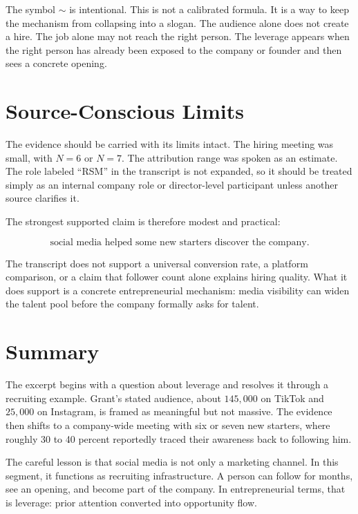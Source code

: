 The symbol \(\sim\) is intentional. This is not a calibrated formula. It is a way to keep the mechanism from collapsing into a slogan. The audience alone does not create a hire. The job alone may not reach the right person. The leverage appears when the right person has already been exposed to the company or founder and then sees a concrete opening.

\section{Source-Conscious Limits}

The evidence should be carried with its limits intact. The hiring meeting was small, with \(N=6\) or \(N=7\). The attribution range was spoken as an estimate. The role labeled ``RSM'' in the transcript is not expanded, so it should be treated simply as an internal company role or director-level participant unless another source clarifies it.

The strongest supported claim is therefore modest and practical:

\begin{equation}
\text{social media helped some new starters discover the company}.
\end{equation}

The transcript does not support a universal conversion rate, a platform comparison, or a claim that follower count alone explains hiring quality. What it does support is a concrete entrepreneurial mechanism: media visibility can widen the talent pool before the company formally asks for talent.

\section{Summary}

The excerpt begins with a question about leverage and resolves it through a recruiting example. Grant's stated audience, about \(145{,}000\) on TikTok and \(25{,}000\) on Instagram, is framed as meaningful but not massive. The evidence then shifts to a company-wide meeting with six or seven new starters, where roughly 30 to 40 percent reportedly traced their awareness back to following him.

The careful lesson is that social media is not only a marketing channel. In this segment, it functions as recruiting infrastructure. A person can follow for months, see an opening, and become part of the company. In entrepreneurial terms, that is leverage: prior attention converted into opportunity flow.